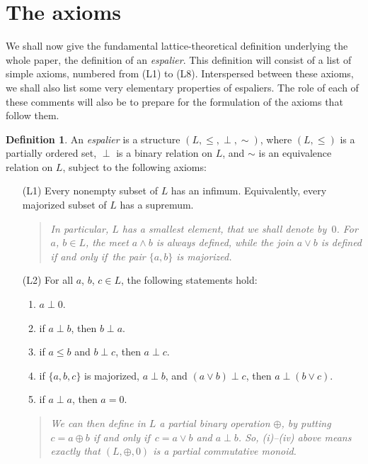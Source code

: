 \documentclass[psamsfonts,reqno]{memo-l}
\theoremstyle{plain}
\theoremstyle{definition}
\newtheorem{definition}[lemma]{Definition}
\theoremstyle{remark}
\numberwithin{equation}{section}
\renewcommand{\iff}{if and only if}
\newcommand{\pcm}{partial commutative mon\-oid}
\newcommand{\set}[1]{\{#1\}}
\begin{document}
\section{The axioms}\label{S:LattAxioms}

We shall now give the fundamental lattice-theoretical definition underlying
the whole paper, the definition of an \emph{espalier}. This
definition will consist of a list of simple axioms, numbered from (L1) to
(L8). Interspersed between these axioms, we shall also list some very
elementary properties of espaliers. The role of each of these comments will
also be to prepare for the formulation of the axioms that follow them.

\begin{definition}\label{D:MeasChLatt}
An \emph{espalier} is a structure $(L,\leq,\perp,\sim)$,
where $(L,\leq)$ is a partially ordered set, $\perp$ is a binary relation on
$L$, and $\sim$ is an equivalence relation on $L$, subject to the following
axioms:
\begin{itemize}
\item[(L1)] Every nonempty subset of $L$ has an infimum. Equivalently, every
majorized subset of $L$ has a supremum.

\begin{quote}
\em In particular, $L$ has a smallest element, that we shall denote by~$0$.
For $a$, $b\in L$, the meet $a\wedge b$ is always defined,
while the join $a\vee b$ is defined \iff\ the pair $\set{a,b}$ is majorized.
\end{quote}

\item[(L2)] For all $a$, $b$, $c\in L$, the following statements hold:
\begin{enumerate}
\item $a\perp 0$.

\item if $a\perp b$, then $b\perp a$.

\item if $a\leq b$ and $b\perp c$, then $a\perp c$.

\item if $\set{a,b,c}$ is majorized, $a\perp b$, and $(a\vee b)\perp c$,
then $a\perp(b\vee c)$.

\item if $a\perp a$, then $a=0$.

\end{enumerate}

\begin{quote}
\em We can then define in $L$ a partial binary operation $\oplus$, by
putting $c=a\oplus b$ \iff\ $c=a\vee b$ and $a\perp b$. So,
\textup{(i)--(iv)} above means exactly that $(L,\oplus,0)$ is a \pcm.


\end{quote}
\end{itemize}
\end{definition}
\end{document}
